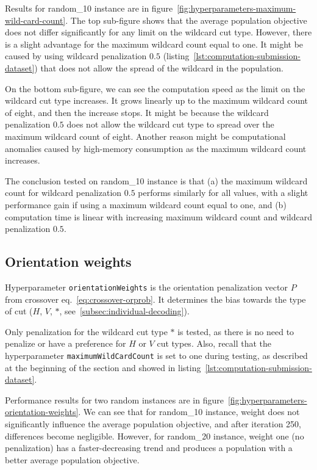 Results for random\_10 instance are in figure~\ref{fig:hyperparameters-maximum-wild-card-count}.
The top sub-figure shows that the average population objective does not differ significantly for any limit on the wildcard cut type.
However, there is a slight advantage for the maximum wildcard count equal to one.
It might be caused by using wildcard penalization $0.5$ (listing~\ref{lst:computation-submission-dataset})
that does not allow the spread of the wildcard in the population.

On the bottom sub-figure, we can see the computation speed as the limit on the wildcard cut type increases.
It grows linearly up to the maximum wildcard count of eight, and then the increase stops.
It might be because the wildcard penalization $0.5$ does not
allow the wildcard cut type to spread over the maximum wildcard count of eight.
Another reason might be computational anomalies caused by high-memory consumption as the maximum wildcard count increases.

The conclusion tested on random\_10 instance is that (a) the maximum wildcard count for wildcard penalization $0.5$
performs similarly for all values, with a slight performance gain if using a maximum wildcard count equal to one,
and (b) computation time is linear with increasing maximum wildcard count and wildcard penalization $0.5$.

\subsection{Orientation weights}\label{subsec:orientation-weights}
Hyperparameter \verb|orientationWeights| is the orientation penalization vector $P$ from crossover eq.~\ref{eq:crossover-orprob}.
It determines the bias towards the type of cut ($H$, $V$, $*$, see~\ref{subsec:individual-decoding}).

Only penalization for the wildcard cut type $*$ is tested, as there is no need to penalize or have a preference for $H$ or $V$ cut types.
Also, recall that the hyperparameter \verb|maximumWildCardCount| is set to one during testing, as described at the beginning of the section and showed in listing~\ref{lst:computation-submission-dataset}.

Performance results for two random instances are in figure~\ref{fig:hyperparameters-orientation-weights}.
We can see that for random\_10 instance,
weight does not significantly influence the average population objective, and after iteration 250, differences become negligible.
However, for random\_20 instance,
weight one (no penalization) has a faster-decreasing trend and produces a population with a better average population objective.

